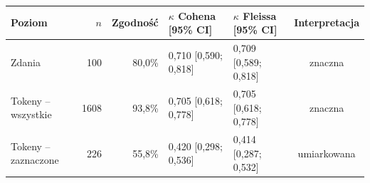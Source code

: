\begin{tabular}{lrrllc}
\toprule
Poziom & $n$ & Zgodność & $\kappa$ Cohena [95\% CI] & $\kappa$ Fleissa [95\% CI] & Interpretacja \\
\midrule
Zdania & 100 & 80{,}0\% & 0{,}710 [0{,}590; 0{,}818] & 0{,}709 [0{,}589; 0{,}818] & znaczna \\
Tokeny -- wszystkie & 1608 & 93{,}8\% & 0{,}705 [0{,}618; 0{,}778] & 0{,}705 [0{,}618; 0{,}778] & znaczna \\
Tokeny -- zaznaczone & 226 & 55{,}8\% & 0{,}420 [0{,}298; 0{,}536] & 0{,}414 [0{,}287; 0{,}532] & umiarkowana \\
\bottomrule
\end{tabular}
